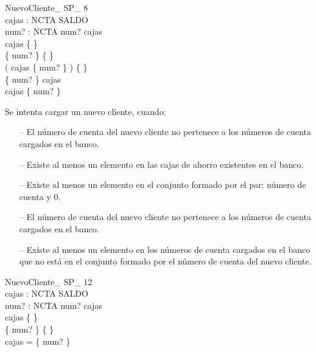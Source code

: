\begin{schema}{NuevoCliente\_ SP\_ 8}\\
 cajas : NCTA \pfun SALDO \\
 num? : NCTA 
\where
 num? \notin \dom cajas \\
 cajas \neq \{ \} \\
 \{ num?  \} \neq \{ \} \\
 ( \dom cajas \cap \dom \{ num?  \} ) \neq \{ \} \\
 \lnot \dom \{ num?  \} \subseteq \dom cajas \\
 \lnot \dom cajas \subseteq \dom \{ num?  \}
\end{schema}

\begin{tcolorbox}[colback=gray!5!white,colframe=gray!50!black,
  colbacktitle=gray!75!black,title=NuevoCliente\_SP\_8]
  Se intenta cargar un nuevo cliente, cuando:
     \begin{itemize}
        \item[--]{El número de cuenta del nuevo cliente no pertenece a los números de cuenta cargados en el banco.}
        \item[--]{Existe al menos un elemento en las cajas de ahorro existentes en el banco.}
        \item[--]{Existe al menos un elemento en el conjunto formado por el par: número de cuenta y 0.}
        \item[--]{El número de cuenta del nuevo cliente no pertenece a los números de cuenta cargados en el banco.}
        \item[--]{Existe al menos un elemento en los números de cuenta cargados en el banco que no está en el conjunto formado por el número de cuenta del nuevo cliente.}
     \end{itemize}
\end{tcolorbox}


\begin{schema}{NuevoCliente\_ SP\_ 12}\\
 cajas : NCTA \pfun SALDO \\
 num? : NCTA 
\where
 num? \in \dom cajas \\
 cajas \neq \{ \} \\
 \{ num?  \} \neq \{ \} \\
 \dom cajas = \dom \{ num?  \}
\end{schema}


